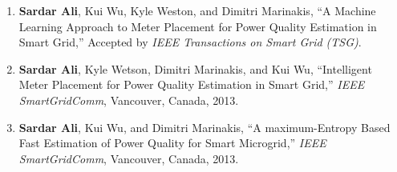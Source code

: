 \label{chap:publications}
\begin{enumerate}
\item \textbf{Sardar Ali}, Kui Wu, Kyle Weston, and Dimitri Marinakis, ``A Machine Learning Approach to Meter Placement for Power Quality Estimation in Smart Grid,'' Accepted by \textit{IEEE Transactions on Smart Grid (TSG)}.


\item \textbf{Sardar Ali}, Kyle Wetson, Dimitri Marinakis, and Kui Wu, ``Intelligent Meter Placement for Power Quality Estimation in Smart Grid,'' \textit{IEEE SmartGridComm}, Vancouver, Canada, 2013.

\item \textbf{Sardar Ali}, Kui Wu, and Dimitri Marinakis, ``A maximum-Entropy Based Fast Estimation of Power Quality for Smart Microgrid,'' \textit{IEEE SmartGridComm}, Vancouver, Canada, 2013.
\end{enumerate}